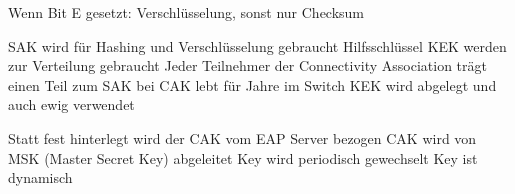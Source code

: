 \documentclass[ngerman,a4paper,12pt]{scrreprt}
\begin{document}
\ul
	\li Wenn Bit E gesetzt: Verschlüsselung, sonst nur Checksum
\ulE


\ul
	\li SAK wird für Hashing und Verschlüsselung gebraucht
	\li Hilfsschlüssel KEK werden zur Verteilung gebraucht
	\li Jeder Teilnehmer der Connectivity Association trägt einen Teil zum SAK bei
	\li CAK lebt für Jahre im Switch
	\li KEK wird abgelegt und auch ewig verwendet
	\li 
\ulE

\ul
	\li Statt fest hinterlegt wird der CAK vom EAP Server bezogen
	\li CAK wird von MSK (Master Secret Key) abgeleitet
	\li Key wird periodisch gewechselt \ra Key ist dynamisch
\ulE
{}
\end{document}

